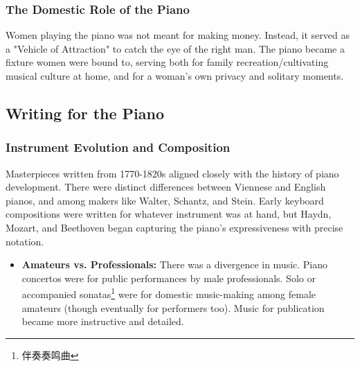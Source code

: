 \documentclass[math,code]{amznotes}
\theoremstyle{remark}
\begin{document}
\subsubsection{The Domestic Role of the Piano}
Women playing the piano was not meant for making money. Instead, it served as a "Vehicle of Attraction" to catch the eye of the right man. The piano became a fixture women were bound to, serving both for family recreation/cultivating musical culture at home, and for a woman's own privacy and solitary moments.

\subsection{Writing for the Piano}
\subsubsection{Instrument Evolution and Composition}
Masterpieces written from 1770-1820s aligned closely with the history of piano development. There were distinct differences between Viennese and English pianos, and among makers like Walter, Schantz, and Stein. 
Early keyboard compositions were written for whatever instrument was at hand, but Haydn, Mozart, and Beethoven began capturing the piano's expressiveness with precise notation.
\begin{itemize}
    \item \textbf{Amateurs vs. Professionals:} There was a divergence in music. Piano concertos were for public performances by male professionals. Solo or accompanied sonatas\footnote{伴奏奏鸣曲} were for domestic music-making among female amateurs (though eventually for performers too). Music for publication became more instructive and detailed.
\end{itemize}
\end{document}
